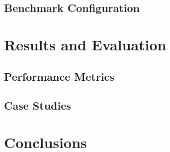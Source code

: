 \section{Benchmark Configuration}

\chapter{Results and Evaluation}
\section{Performance Metrics}

\section{Case Studies}

\chapter{Conclusions}
